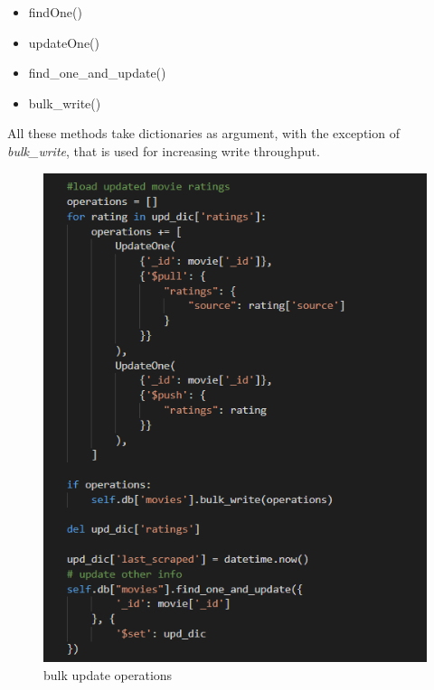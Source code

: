 \documentclass[11pt]{article}
\begin{document}
\begin{itemize}
    \item findOne()
    \item updateOne()
    \item find\_one\_and\_update()
    \item bulk\_write()
\end{itemize}
All these methods take dictionaries as argument, with the exception of \emph{bulk\_write}, that is used for increasing write throughput.
\begin{figure}[H]
    \centering
        \includegraphics[scale=.65]{figures/codepic/f5.png}
    \caption{bulk update operations}
    \label{fig:1}
\end{figure}
\end{document}
